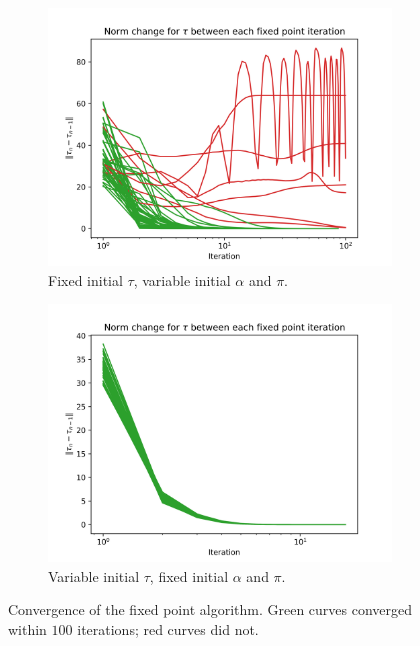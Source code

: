 \documentclass[switch, 12pt]{article}
\begin{document}
\begin{multicols}{2}
    \begin{figure}
        \centering
        \begin{subfigure}{0.49\linewidth}
            \centering
            \includegraphics[width=0.9\linewidth]{figures/fixed_point_convergence_fixed_tau.png}
            \caption{Fixed initial $\tau$, variable initial $\alpha$ and $\pi$.}
            \label{fig:fixed_point_cv_tau}
        \end{subfigure}
        \begin{subfigure}{0.49\linewidth}
            \centering
            \includegraphics[width=0.9\linewidth]{figures/fixed_point_convergence_fixed_X_alpha_pi.png}
            \caption{Variable initial $\tau$, fixed initial $\alpha$ and $\pi$.}
            \label{fig:fixed_point_cv_X}
        \end{subfigure}
        \caption{Convergence of the fixed point algorithm. Green curves converged within $100$ iterations; red curves did not.}
        \label{fig:fixed_point_cv}
    \end{figure}


\end{multicols}
\end{document}
